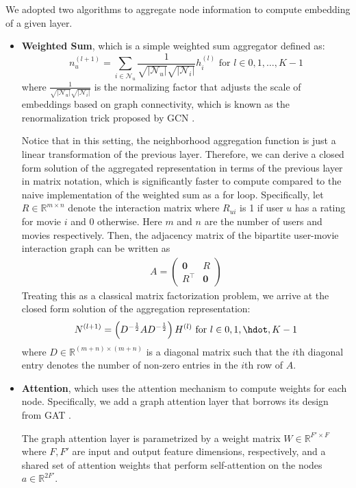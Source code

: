 \documentclass{article}
\begin{document}
We adopted two algorithms to aggregate node information to compute embedding of a given layer. 
\begin{itemize}
    \item \textbf{Weighted Sum}, which is a simple weighted sum aggregator defined as: $$n_u^{(l+1)}=\sum_{i\in \mathcal{N}_u} \frac{1}{\sqrt{|\mathcal{N}_u|} \sqrt{|\mathcal{N}_i|}} h_i^{(l)} \text{ for } l \in 0, 1, \hdots, K - 1$$
    where $\frac{1}{\sqrt{|\mathcal{N}_u|} \sqrt{|\mathcal{N}_i|}}$ is the normalizing factor that adjusts the scale of embeddings based on graph connectivity, which is known as the renormalization trick proposed by GCN \cite{gcn}.

    Notice that in this setting, the neighborhood aggregation function is just a linear transformation of the previous layer. Therefore, we can derive a closed form solution of the aggregated representation in terms of the previous layer in matrix notation, which is significantly faster to compute compared to the naive implementation of the weighted sum as a for loop. Specifically, let $R \in \mathbb{R}^{m \times n}$ denote the interaction matrix where $R_{ui}$ is 1 if user $u$ has a rating for movie $i$ and 0 otherwise. Here $m$ and $n$ are the number of users and movies respectively. Then, the adjacency matrix of the bipartite user-movie interaction graph can be written as
    \begin{align*}
        A =
        \begin{pmatrix}
        \mathbf{0} & R \\
        R^\top & \mathbf{0}
        \end{pmatrix}
    \end{align*}
    Treating this as a classical matrix factorization problem, we arrive at the closed form solution of the aggregation representation:
    \begin{align*}
        N^{(l+1)} = \left( D^{-\frac{1}{2}} A D^{-\frac{1}{2}} \right) H^{(l)} \text{ for } l \in 0, 1, \hdot, K - 1
    \end{align*}
    where $D \in \mathbb{R}^{(m+n) \times (m+n)}$ is a diagonal matrix such that the $i$th diagonal entry denotes the number of non-zero entries in the $i$th row of $A$.
    
    \item \textbf{Attention}, which uses the attention mechanism to compute weights for each node. Specifically, we add a graph attention layer that borrows its design from GAT \cite{gat}. 
    
    The graph attention layer is parametrized by a weight matrix $W \in \mathbb{R}^{F' \times F}$ where $F, F'$ are input and output feature dimensions, respectively, and a shared set of attention weights that perform self-attention on the nodes $a \in \mathbb{R}^{2F'}$. 


\end{itemize}
\end{document}
